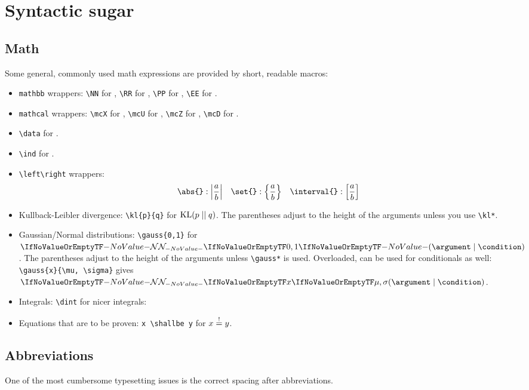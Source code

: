 \documentclass
[
]
{article}
\begin{document}
\section{Syntactic sugar}
\subsection{Math}
Some general, commonly used math expressions are provided by short, readable macros:
\begin{itemize}
	\item \texttt{mathbb} wrappers: \texttt{\textbackslash NN} for \NN, \texttt{\textbackslash RR} for \RR, \texttt{\textbackslash PP} for \PP, \texttt{\textbackslash EE} for \EE.
	\item \texttt{mathcal} wrappers: \texttt{\textbackslash mcX} for \mcX, \texttt{\textbackslash mcU} for \mcU, \texttt{\textbackslash mcZ} for \mcZ, \texttt{\textbackslash mcD} for \mcD.
	\item \texttt{\textbackslash data} for \data.
	\item \texttt{\textbackslash ind} for \ind.	
	\item \texttt{\textbackslash left\textbackslash right} wrappers: 
	\begin{align*}
		\texttt{\textbackslash abs\{\}}:{\left\lvert\frac a b\right\rvert} \quad\texttt{\textbackslash set\{\}}:{\left\{\frac ab\right\}}	\quad\texttt{\textbackslash interval\{\}}:{\left[\frac ab\right]}
	\end{align*}
	\item Kullback-Leibler divergence: \texttt{\textbackslash kl\{p\}\{q\}} for $\kl{p}{q}$. The parentheses adjust to the height of the arguments unless you use \texttt{\textbackslash kl*}.
	\item Gaussian/Normal distributions: \texttt{\textbackslash gauss\{0,1\}} for $\gauss{0, 1}$. The parentheses adjust to the height of the arguments unless \texttt{\textbackslash gauss*} is used. Overloaded, can be used for conditionals as well: \texttt{\textbackslash gauss\{x\}\{\textbackslash mu, \textbackslash sigma\}} gives $\gauss{x}{\mu, \sigma}$.
	\item Integrals: \texttt{\textbackslash dint} for nicer integrals: 
	\item Equations that are to be proven: \texttt{x \textbackslash shallbe y} for $x \;{\overset{!}=}\; y$. 
\end{itemize}
\subsection{Abbreviations}
One of the most cumbersome typesetting issues is the correct spacing after abbreviations.
\end{document}

